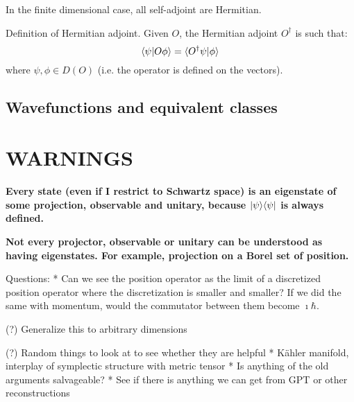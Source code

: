 In the finite dimensional case, all self-adjoint are Hermitian.

Definition of Hermitian adjoint. Given $O$, the Hermitian adjoint $O^\dagger$ is such that:
\begin{equation}
	\langle\psi|O \phi\rangle = \langle O^\dagger \psi | \phi \rangle
\end{equation}
where $\psi, \phi \in D(O)$ (i.e. the operator is defined on the vectors).

\subsection{Wavefunctions and equivalent classes}


\section{WARNINGS}

\textbf{Every state (even if I restrict to Schwartz space) is an eigenstate of some projection, observable and unitary, because $|\psi \rangle \langle \psi|$ is always defined.}

\textbf{Not every projector, observable or unitary can be understood as having eigenstates. For example, projection on a Borel set of position.}


Questions:
* Can we see the position operator as the limit of a discretized position operator where the discretization is smaller and smaller? If we did the same with momentum, would the commutator between them become $\imath \hbar$.

(?) Generalize this to arbitrary dimensions

(?) Random things to look at to see whether they are helpful
* Kähler manifold, interplay of symplectic structure with metric tensor
* Is anything of the old arguments salvageable?
* See if there is anything we can get from GPT or other reconstructions



  

